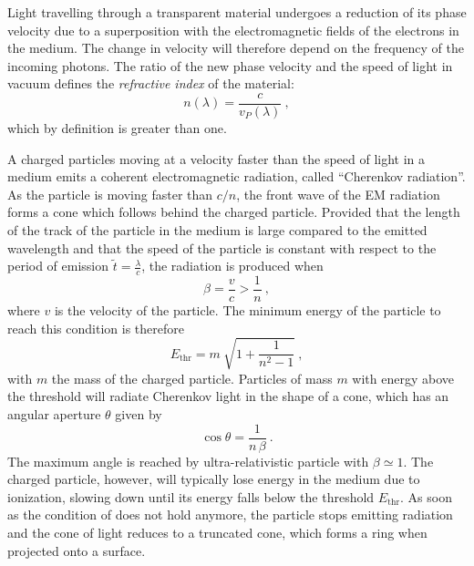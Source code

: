 Light travelling through a transparent material undergoes a reduction of its phase velocity %
due to a superposition with the electromagnetic fields of the electrons in the medium. %
The change in velocity will therefore depend on the frequency of the incoming photons.
The ratio of the new phase velocity and the speed of light in vacuum defines the \emph{refractive index} %
of the material:
\begin{equation}
	\label{eq:ref_index}
	n(\lambda) = \frac{c}{v_P(\lambda)}\ ,
\end{equation}
which by definition is greater than one.

A charged particles moving at a velocity faster than the speed of light in a medium %
emits a coherent electromagnetic radiation, called ``Cherenkov radiation''. %
As the particle is moving faster than $c / n$, the front wave of the EM radiation forms a cone %
which follows behind the charged particle.
Provided that the length of the track of the particle in the medium is large compared to the emitted wavelength %
and that the speed of the particle is constant with respect to the period of emission $\tilde{t} = \frac{\lambda}{c}$,
the radiation is produced when
\begin{equation}
	\label{eq:cherenkov}
	\beta = \frac{v}{c} > \frac{1}{n}\ ,
\end{equation}
where $v$ is the velocity of the particle.
The minimum energy of the particle to reach this condition is therefore
\begin{equation}
	\label{eq:cherenkov_threshold}
	E_\text{thr} = m\ \sqrt{1 + \frac{1}{n^2-1}}\ ,
\end{equation}
with $m$ the mass of the charged particle.
Particles of mass $m$ with energy above the threshold will radiate Cherenkov light in the shape of a cone, %
which has an angular aperture $\theta$ given by
\begin{equation}
	\cos \theta = \frac{1}{n\,\beta} \ .
\end{equation}
The maximum angle is reached by ultra-relativistic particle with $\beta \simeq 1$.
The charged particle, however, will typically lose energy in the medium due to ionization, %
slowing down until its energy falls below the threshold $E_\text{thr}$.
As soon as the condition of  does not hold anymore, %
the particle stops emitting radiation and the cone of light reduces to a truncated cone, %
which forms a ring when projected onto a surface.

